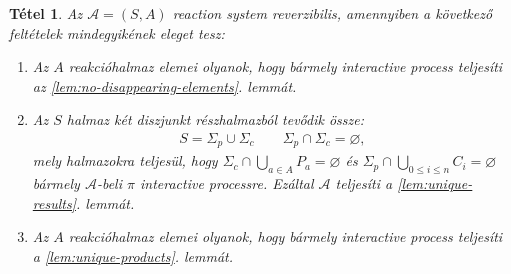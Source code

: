 \documentclass[12pt]{article}
\theoremstyle{definition}
\theoremstyle{remark}
\theoremstyle{plain}
\newtheorem{theorem}{Tétel}
\theoremstyle{remark}
\theoremstyle{plain}
\let\emptyset\varnothing
\begin{document}
    \begin{theorem}\label{the:reversible-reaction-system}
        Az $\mathscr{A} = (S, A)$ \textit{reaction system} reverzibilis, amennyiben a következő feltételek mindegyikének eleget tesz:
        \begin{enumerate}[label={(\arabic*)}]
            \item
            Az $A$ reakcióhalmaz elemei olyanok, hogy bármely \textit{interactive process} teljesíti az \ref{lem:no-disappearing-elements}. lemmát.

            \item
            Az $S$ halmaz két diszjunkt részhalmazból tevődik össze:
            \begin{align*}
                S = \Sigma_{p} \cup \Sigma_{c} \qquad \Sigma_{p} \cap \Sigma_{c} = \emptyset,
            \end{align*}
            mely halmazokra teljesül, hogy $\Sigma_{c} \cap \bigcup_{a \in A} P_{a} = \emptyset$ és $\Sigma_{p} \cap \bigcup_{0 \leq i \leq n} C_{i} = \emptyset$ bármely $\mathscr{A}$-beli $\pi$ \textit{interactive processre}. Ezáltal $\mathscr{A}$ teljesíti a \ref{lem:unique-results}. lemmát.

            \item
            Az $A$ reakcióhalmaz elemei olyanok, hogy bármely \textit{interactive process} teljesíti a \ref{lem:unique-products}. lemmát.
        \end{enumerate}
    \end{theorem}
\end{document}
